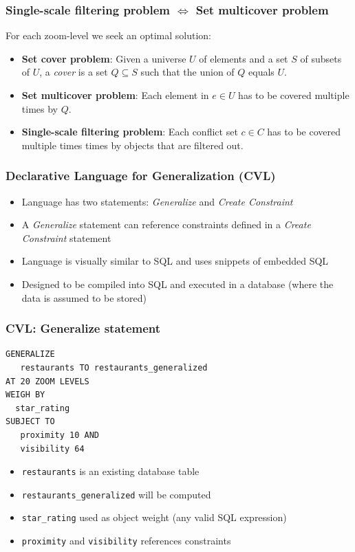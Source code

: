 \documentclass{beamer}
\begin{document}
{\begin{center}
  \end{center}
}

\frame
{
  \frametitle{Single-scale filtering problem $\Leftrightarrow$ Set multicover problem}
  For each zoom-level we seek an optimal solution:
  \begin{itemize}
  \item \textbf{Set cover problem}: Given a universe $U$ of elements and a set $S$ of subsets of $U$, a \emph{cover} is a set $Q \subseteq S$ such that the union of $Q$ equals $U$.
  \item \textbf{Set multicover problem}: Each element in $e \in U$ has to be covered multiple times by $Q$.
  \item \textbf{Single-scale filtering problem}: Each conflict set $c \in C$ has to be covered multiple times times by objects that are filtered out.
  \end{itemize}
}


\begin{frame}[fragile]
\frametitle{Declarative Language for Generalization (CVL)}
\begin{itemize}
\item Language has two statements: \emph{Generalize} and \emph{Create Constraint}
\item A \emph{Generalize} statement can reference constraints defined in a \emph{Create Constraint} statement
\item Language is visually similar to SQL and uses snippets of embedded SQL
\item Designed to be compiled into SQL and executed in a database (where the data is assumed to be stored)
\end{itemize}
\end{frame}

\begin{frame}[fragile]
\frametitle{CVL: Generalize statement}
\begin{lstlisting}
GENERALIZE 
   restaurants TO restaurants_generalized
AT 20 ZOOM LEVELS
WEIGH BY
  star_rating
SUBJECT TO 
   proximity 10 AND
   visibility 64
\end{lstlisting}
\begin{itemize}
\item \texttt{restaurants} is an existing database table
\item \texttt{restaurants\_generalized} will be computed  
\item \texttt{star\_rating} used as object weight (any valid SQL expression)
\item \texttt{proximity} and \texttt{visibility} references constraints
\end{itemize}
\end{frame}
\end{document}

